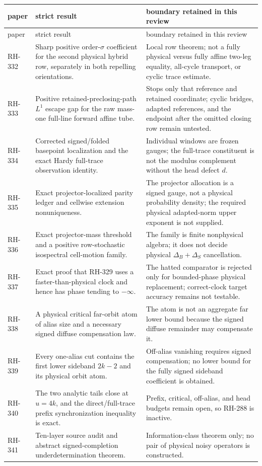 \documentclass[11pt]{article}
\theoremstyle{remark}
\begin{document}
\begin{longtable}{@{}>{\raggedright\arraybackslash}p{}
>{\raggedright\arraybackslash}p{}
>{\raggedright\arraybackslash}p{}@{}}
\toprule
paper & strict result & boundary retained in this review\\
\midrule
\endfirsthead
\toprule
paper & strict result & boundary retained in this review\\
\midrule
\endhead
RH-332 & Sharp positive order-$\sigma$ coefficient for the second physical
hybrid row, separately in both repelling orientations. & Local row theorem;
not a fully physical versus fully affine two-leg equality, all-cycle
transport, or cyclic trace estimate.\\
RH-333 & Positive retained-preclosing-path $L^1$ escape gap for the raw
mass-one full-line forward affine tube. & Stops only that reference and
retained coordinate; cyclic bridges, adapted references, and the endpoint
after the omitted closing row remain untested.\\
RH-334 & Corrected signed/folded basepoint localization and the exact Hardy
full-trace observation identity. & Individual windows are frozen gauges;
the full-trace constituent is not the modulus complement without the head
defect $d$.\\
RH-335 & Exact projector-localized parity ledger and cellwise extension
nonuniqueness. & The projector allocation is a signed gauge, not a physical
probability density; the required physical adapted-norm upper exponent is
not supplied.\\
RH-336 & Exact projector-mass threshold and a positive row-stochastic
isospectral cell-motion family. & The family is finite nonphysical algebra;
it does not decide physical $\Delta_B+\Delta_S$ cancellation.\\
RH-337 & Exact proof that RH-329 uses a faster-than-physical clock and hence
has phase tending to $-\infty$. & The hatted comparator is rejected only for
bounded-phase physical replacement; correct-clock target accuracy remains
not testable.\\
RH-338 & A physical critical far-orbit atom of alias size and a necessary
signed diffuse compensation law. & The atom is not an aggregate far lower
bound because the signed diffuse remainder may compensate it.\\
RH-339 & Every one-alias cut contains the first lower sideband $2k-2$ and its
physical orbit atom. & Off-alias vanishing requires signed compensation; no
lower bound for the fully signed sideband coefficient is obtained.\\
RH-340 & The two analytic tails close at $u=4k$, and the direct/full-trace
prefix synchronization inequality is exact. & Prefix, critical, off-alias,
and head budgets remain open, so RH-288 is inactive.\\
RH-341 & Ten-layer source audit and abstract signed-completion
underdetermination theorem. & Information-class theorem only; no pair of
physical noisy operators is constructed.\\
\bottomrule
\end{longtable}
\end{document}

